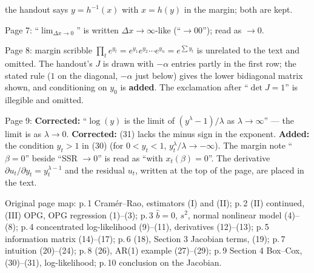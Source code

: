 \documentclass[11pt]{article}
\begin{document}
\begin{transcriptnotes}
       the handout says $y=h^{-1}(x)$ with $x=h(y)$ in the margin; both are kept.
 \item Page 7: ``$\lim_{\Delta x\to0}$'' is written $\Delta x\to\infty$-like (``$\to00$''); read as $\to0$.
 \item Page 8: margin scribble $\prod_{t}e^{y_{t}}=e^{y_{1}}e^{y_{2}}\cdots e^{y_{n}}=e^{\sum y_{t}}$ is unrelated
       to the text and omitted. The handout's $J$ is drawn with $-\alpha$ entries partly in the
       first row; the stated rule ($1$ on the diagonal, $-\alpha$ just below) gives the lower
       bidiagonal matrix shown, and conditioning on $y_{0}$ is \textbf{added}. The exclamation after
       ``$\det J=1$'' is illegible and omitted.
 \item Page 9: \textbf{Corrected:} ``$\log(y)$ is the limit of $(y^{\lambda}-1)/\lambda$ as $\lambda\to\infty$'' --- the
       limit is as $\lambda\to0$. \textbf{Corrected:} (31) lacks the minus sign in the exponent.
       \textbf{Added:} the condition $y_{t}>1$ in (30) (for $0<y_{t}<1$, $y_{t}^{\lambda}/\lambda\to-\infty$). The
       margin note ``$\beta=0$'' beside ``SSR $\to0$'' is read as ``with $x_{t}(\beta)=0$''. The
       derivative $\partial u_{t}/\partial y_{t}=y_{t}^{\lambda-1}$ and the residual $u_{t}$, written at the top of the
       page, are placed in the text.
 \item Original page map: p.\,1 Cram\'er--Rao, estimators (I) and (II); p.\,2 (II) continued,
       (III) OPG, OPG regression (1)--(3); p.\,3 $\hat b=0$, $s^{2}$, normal nonlinear model (4)--(8);
       p.\,4 concentrated log-likelihood (9)--(11), derivatives (12)--(13); p.\,5 information matrix
       (14)--(17); p.\,6 (18), Section 3 Jacobian terms, (19); p.\,7 intuition (20)--(24); p.\,8 (26),
       AR(1) example (27)--(29); p.\,9 Section 4 Box--Cox, (30)--(31), log-likelihood; p.\,10
       conclusion on the Jacobian.
\end{transcriptnotes}
\end{document}
